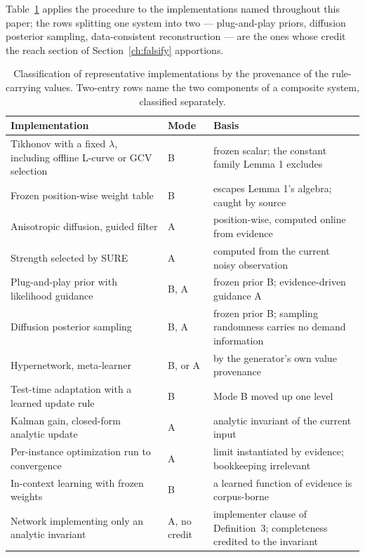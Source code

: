 Table~\ref{tab:modes} applies the procedure to the implementations named throughout this paper; the rows splitting one system into two --- plug-and-play priors, diffusion posterior sampling, data-consistent reconstruction --- are the ones whose credit the reach section of Section~\ref{ch:falsify} apportions.

\begin{table}[t]
\caption{Classification of representative implementations by the provenance of the rule-carrying values. Two-entry rows name the two components of a composite system, classified separately.}
\label{tab:modes}
\centering
\small
\renewcommand{\arraystretch}{0.95}
\begin{tabular}{@{}>{\raggedright\arraybackslash}p{}>{\centering\arraybackslash}p{}>{\raggedright\arraybackslash}p{}@{}}
\hline
\textbf{Implementation} & \textbf{Mode} & \textbf{Basis}\\
\hline
Tikhonov with a fixed $\lambda$, including offline L-curve or GCV selection & B & frozen scalar; the constant family Lemma 1 excludes\\
\hline
Frozen position-wise weight table & B & escapes Lemma 1's algebra; caught by source\\
\hline
Anisotropic diffusion, guided filter & A & position-wise, computed online from evidence\\
\hline
Strength selected by SURE & A & computed from the current noisy observation\\
\hline
Plug-and-play prior with likelihood guidance & B, A & frozen prior B; evidence-driven guidance A\\
\hline
Diffusion posterior sampling & B, A & frozen prior B; sampling randomness carries no demand information\\
\hline
Hypernetwork, meta-learner & B, or A & by the generator's own value provenance\\
\hline
Test-time adaptation with a learned update rule & B & Mode B moved up one level\\
\hline
Kalman gain, closed-form analytic update & A & analytic invariant of the current input\\
\hline
Per-instance optimization run to convergence & A & limit instantiated by evidence; bookkeeping irrelevant\\
\hline
In-context learning with frozen weights & B & a learned function of evidence is corpus-borne\\
\hline
Network implementing only an analytic invariant & A, no credit & implementer clause of Definition~3; completeness credited to the invariant\\

\end{tabular}
\end{table}
